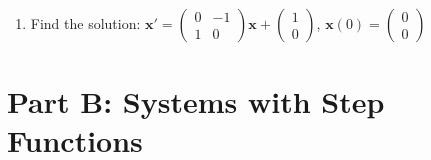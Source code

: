 \documentclass[12pt]{article}
\begin{document}
\begin{enumerate}
\item Find the solution: $\mathbf{x}' = \begin{pmatrix} 0 & -1 \\ 1 & 0 \end{pmatrix}\mathbf{x} + \begin{pmatrix} 1 \\ 0 \end{pmatrix}$, $\mathbf{x}(0) = \begin{pmatrix} 0 \\ 0 \end{pmatrix}$
\end{enumerate}

\section*{Part B: Systems with Step Functions}
\end{document}
